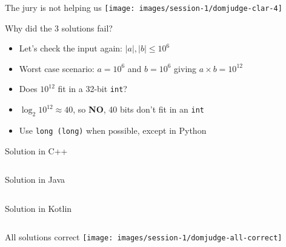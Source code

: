\documentclass[11pt,pdf, aspectratio=169]{beamer}
\begin{document}
  \begin{frame}{The jury is not helping us}
    \texttt{[image: images/session-1/domjudge-clar-4]}
  \end{frame}
  \begin{frame}{Why did the 3 solutions fail?}
    \begin{itemize}
      \item <1-> Let's check the input again: $|a|,|b| \leq 10^6$
      \item <2-> Worst case scenario: $a=10^6$ and $b=10^6$ giving  $a \times b = 10^{12}$
      \item <3-> Does $10^{12}$ fit in a 32-bit \texttt{int}?
      \item <4-> $\log_2 10^{12} \approx 40$, so \textbf{NO}, 40 bits don't fit in an \texttt{int}
      \item <5-> Use \texttt{long (long)} when possible, except in Python
    \end{itemize}
  \end{frame}
  \begin{frame}[containsverbatim]{Solution in C++}
    \inputminted{c++}{code/session-1/c++/example.cpp}
  \end{frame}
  \begin{frame}[containsverbatim]{Solution in Java}
    \inputminted{java}{code/session-1/java/example.java}
  \end{frame}
  \begin{frame}[containsverbatim]{Solution in Kotlin}
    \inputminted{kotlin}{code/session-1/kotlin/example.kt}
  \end{frame}
  \begin{frame}{All solutions correct}
    \texttt{[image: images/session-1/domjudge-all-correct]}
  \end{frame}
\end{document}
